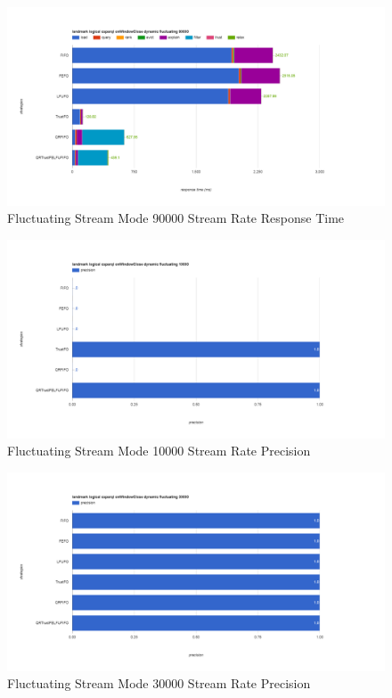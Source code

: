 \begin{figure}[!htbp]
    \centering
    \includegraphics[width=\textwidth]{img/app3-f-90000-r.png}
    \caption{Fluctuating Stream Mode 90000 Stream Rate Response Time}
\end{figure}
\begin{figure}[!htbp]
    \centering
    \includegraphics[width=\textwidth]{img/app3-f-10000-p.png}
    \caption{Fluctuating Stream Mode 10000 Stream Rate Precision}
\end{figure}
\begin{figure}[!htbp]
    \centering
    \includegraphics[width=\textwidth]{img/app3-f-30000-p.png}
    \caption{Fluctuating Stream Mode 30000 Stream Rate Precision}
\end{figure}
